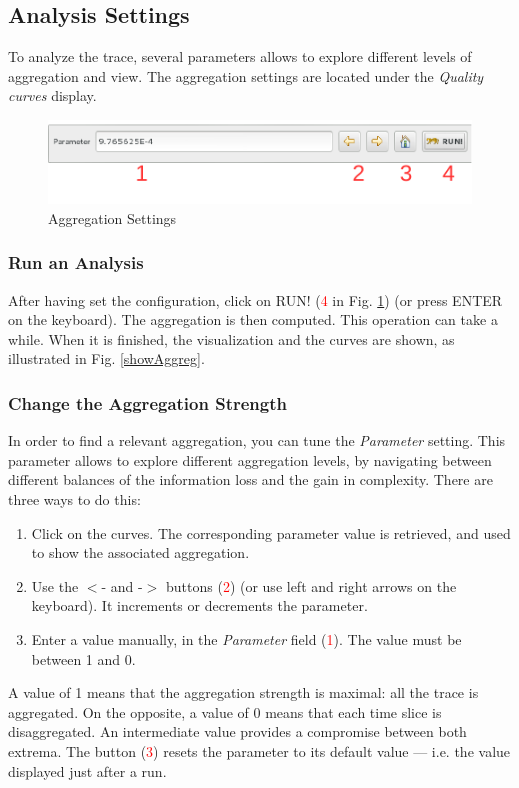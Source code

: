 \documentclass[twoside]{article}
\begin{document}
\begin{sloppypar}
\subsection{Analysis Settings}
To analyze the trace, several parameters allows to explore  different levels of aggregation and view. The aggregation settings are located under the \textit{Quality curves} display.
 
\begin{figure}[h!]
	\centering
	\includegraphics[scale=1.0]{images/aggregationSettings.pdf}
	\caption{Aggregation Settings}
	\label{aggregSettings}
\end{figure}

\subsubsection{Run an Analysis}
After having set the configuration, click on RUN! (\textcolor{red}{4} in Fig. \ref{aggregSettings}) (or press ENTER on the keyboard). The aggregation is then computed. This operation can take a while. When it is finished, the visualization and the curves are shown, as illustrated in Fig. \ref{showAggreg}.

\subsubsection{Change the Aggregation Strength}
In order to find a relevant aggregation, you can tune the \textit{Parameter} setting. This parameter allows to explore different aggregation levels, by navigating between different balances of the information loss and the gain in complexity. There are three ways to do this:
\begin{enumerate}
	\item Click on the curves. The corresponding parameter value is retrieved, and used to show the associated aggregation.
	\item Use the $<$- and -$>$ buttons (\textcolor{red}{2}) (or use left and right arrows on the keyboard). It increments or decrements the parameter.
	\item Enter a value manually, in the \textit{Parameter} field (\textcolor{red}{1}). The value must be between 1 and 0.
\end{enumerate}
A value of 1 means that the aggregation strength is maximal: all the trace is aggregated. On the opposite, a value of 0 means that each time slice is disaggregated. An intermediate value provides a compromise between both extrema. The button (\textcolor{red}{3}) resets the parameter to its default value --- i.e. the value displayed just after a run.


\end{sloppypar}
\end{document}
